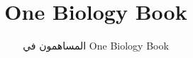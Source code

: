 \documentclass[11pt,a4paper,twoside,openany]{book}
\title{One Biology Book}
\author{المساهمون في One Biology Book}
\date{\bookdate}
\begin{document}
\frontmatter




\tableofcontents

\mainmatter



\appendix
\part{\omsolutionspart}


\backmatter
\printindex
\end{document}

